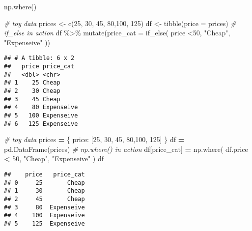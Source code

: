 \documentclass[
]{book}
\newenvironment{Shaded}{\begin{snugshade}}{\end{snugshade}}
\newcommand{\AttributeTok}[1]{\textcolor[rgb]{0.77,0.63,0.00}{#1}}
\newcommand{\CommentTok}[1]{\textcolor[rgb]{0.56,0.35,0.01}{\textit{#1}}}
\newcommand{\DecValTok}[1]{\textcolor[rgb]{0.00,0.00,0.81}{#1}}
\newcommand{\FunctionTok}[1]{\textcolor[rgb]{0.00,0.00,0.00}{#1}}
\newcommand{\NormalTok}[1]{#1}
\newcommand{\OperatorTok}[1]{\textcolor[rgb]{0.81,0.36,0.00}{\textbf{#1}}}
\newcommand{\OtherTok}[1]{\textcolor[rgb]{0.56,0.35,0.01}{#1}}
\newcommand{\SpecialCharTok}[1]{\textcolor[rgb]{0.00,0.00,0.00}{#1}}
\newcommand{\StringTok}[1]{\textcolor[rgb]{0.31,0.60,0.02}{#1}}
\begin{document}
np.where()

\begin{Shaded}
\begin{Highlighting}[]
\CommentTok{\# toy data}
\NormalTok{prices }\OtherTok{\textless{}{-}} \FunctionTok{c}\NormalTok{(}\DecValTok{25}\NormalTok{, }\DecValTok{30}\NormalTok{, }\DecValTok{45}\NormalTok{, }\DecValTok{80}\NormalTok{,}\DecValTok{100}\NormalTok{, }\DecValTok{125}\NormalTok{)}
\NormalTok{df }\OtherTok{\textless{}{-}} \FunctionTok{tibble}\NormalTok{(}\AttributeTok{price =}\NormalTok{ prices)}
\CommentTok{\# if\_else in action}
\NormalTok{df }\SpecialCharTok{\%\textgreater{}\%} 
  \FunctionTok{mutate}\NormalTok{(}\AttributeTok{price\_cat =} \FunctionTok{if\_else}\NormalTok{(}
\NormalTok{    price }\SpecialCharTok{\textless{}}\DecValTok{50}\NormalTok{, }\StringTok{"Cheap"}\NormalTok{, }\StringTok{"Expenseive"}
\NormalTok{  ))}
\end{Highlighting}
\end{Shaded}

\begin{verbatim}
## # A tibble: 6 x 2
##   price price_cat 
##   <dbl> <chr>     
## 1    25 Cheap     
## 2    30 Cheap     
## 3    45 Cheap     
## 4    80 Expenseive
## 5   100 Expenseive
## 6   125 Expenseive
\end{verbatim}

\begin{Shaded}
\begin{Highlighting}[]
\CommentTok{\# toy data}
\NormalTok{prices }\OperatorTok{=}\NormalTok{ \{}
  \StringTok{\textquotesingle{}price\textquotesingle{}}\NormalTok{: [}\DecValTok{25}\NormalTok{, }\DecValTok{30}\NormalTok{, }\DecValTok{45}\NormalTok{, }\DecValTok{80}\NormalTok{,}\DecValTok{100}\NormalTok{, }\DecValTok{125}\NormalTok{]}
\NormalTok{\}}
\NormalTok{df }\OperatorTok{=}\NormalTok{ pd.DataFrame(prices)}
\CommentTok{\# np.where() in action}
\NormalTok{df[}\StringTok{\textquotesingle{}price\_cat\textquotesingle{}}\NormalTok{] }\OperatorTok{=}\NormalTok{ np.where(}
\NormalTok{  df.price }\OperatorTok{\textless{}} \DecValTok{50}\NormalTok{, }\StringTok{"Cheap"}\NormalTok{, }\StringTok{"Expenseive"}
\NormalTok{)}
\NormalTok{df}
\end{Highlighting}
\end{Shaded}

\begin{verbatim}
##    price   price_cat
## 0     25       Cheap
## 1     30       Cheap
## 2     45       Cheap
## 3     80  Expenseive
## 4    100  Expenseive
## 5    125  Expenseive
\end{verbatim}
\end{document}
